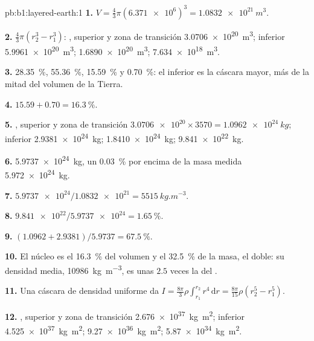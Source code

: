 \begin{solution}{pb:b1:layered-earth:1}
\textbf{1.} $V = \tfrac43\pi(\num{6.371e6})^3 = \qty{1.0832e21}{m^3}$.

\textbf{2.} $\tfrac43\pi(r_2^3 - r_1^3)$: ,  superior y zona de transición \qty{3.0706e20}{m^3};  inferior
\qty{5.9961e20}{m^3};  \qty{1.6890e20}{m^3};  \qty{7.634e18}{m^3}.

\textbf{3.} \qty{28.35}{\percent}, \qty{55.36}{\percent}, \qty{15.59}{\percent} y \qty{0.70}{\percent}: el  inferior es la
cáscara mayor, más de la mitad del volumen de la Tierra.

\textbf{4.} $15.59 + 0.70 = \qty{16.3}{\percent}$.

\textbf{5.} ,  superior y zona de transición $\num{3.0706e20}\times3570 =
\qty{1.0962e24}{kg}$;  inferior
\qty{2.9381e24}{kg};  \qty{1.8410e24}{kg};  \qty{9.841e22}{kg}.

\textbf{6.} \qty{5.9737e24}{kg}, un \qty{0.03}{\percent} por encima de la masa medida \qty{5.972e24}{kg}.

\textbf{7.} $\num{5.9737e24}/\num{1.0832e21} = \qty{5515}{kg.m^{-3}}$.

\textbf{8.} $\num{9.841e22}/\num{5.9737e24} = \qty{1.65}{\percent}$.

\textbf{9.} $(1.0962 + 2.9381)/5.9737 = \qty{67.5}{\percent}$.

\textbf{10.} El núcleo es el \qty{16.3}{\percent} del volumen y el \qty{32.5}{\percent} de la masa, el doble: su densidad media,
\qty{10986}{kg.m^{-3}}, es unas $2.5$ veces la del .

\textbf{11.} Una cáscara de densidad uniforme da
$I = \tfrac{8\pi}{3}\rho\int_{r_1}^{r_2} r^4\,\mathrm dr = \tfrac{8\pi}{15}\rho
(r_2^5 - r_1^5)$.

\textbf{12.} ,  superior y zona de transición \qty{2.676e37}{kg.m^2};  inferior \qty{4.525e37}{kg.m^2};
 \qty{9.27e36}{kg.m^2};  \qty{5.87e34}{kg.m^2}.


\end{solution}
